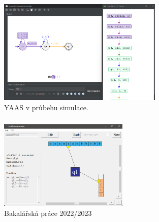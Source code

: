 \begin{figure}[h]
    \centering
    \includegraphics[width=0.7\textwidth]{Figures/PrntScrn_YAAS.png}
    \caption{YAAS v průbehu simulace.}\label{fig:YAAS}
\end{figure}

\begin{figure}[h]
    \centering
    \includegraphics[width=0.55\textwidth]{Figures/PrntScrn_BP.png}
    \caption{Bakalářská práce 2022/2023}\label{fig:BP}
\end{figure}

\endinput
